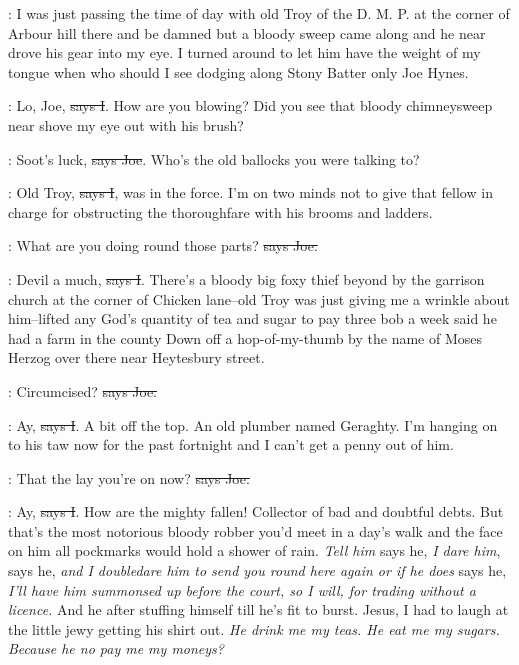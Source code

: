 \Nq:
I was just passing the time of day with old Troy of the D. M. P. at the
corner of Arbour hill there and be damned but a bloody sweep came along
and he near drove his gear into my eye. I turned around to let him have
the weight of my tongue when who should I see dodging along Stony Batter
only Joe Hynes.

:
Lo, Joe, \sout{says I}. How are you blowing? Did you see that bloody
chimneysweep near shove my eye out with his brush?

\joe:
Soot's luck, \sout{says Joe}.
Who's the old ballocks you were talking to?

:
Old Troy, \sout{says I}, was in the force.
I'm on two minds not to give that
fellow in charge for obstructing the thoroughfare
with his brooms and
ladders.

\joe:
What are you doing round those parts? \sout{says Joe.}

:
Devil a much, \sout{says I}.
There's a bloody big foxy thief beyond by the
garrison church at the corner of Chicken lane--old Troy was just giving
me a wrinkle about him--lifted any God's quantity of tea and sugar to pay
three bob a week said he had a farm in the county Down off a
hop-of-my-thumb by the name of Moses Herzog over there near Heytesbury
street.

\joe:
Circumcised? \sout{says Joe.}

:
Ay, \sout{says I}.
A bit off the top. An old plumber named Geraghty. I'm
hanging on to his taw now for the past fortnight and I can't get a penny
out of him.

\joe:
That the lay you're on now? \sout{says Joe.}

:
Ay, \sout{says I}.
How are the mighty fallen! Collector of bad and doubtful
debts. But that's the most notorious bloody robber you'd meet in a day's
walk and the face on him all pockmarks would hold a shower of rain. \emph{Tell
him} says he, \emph{I dare him}, says he, \emph{and I doubledare him to send you round
here again or if he does} says he, \emph{I'll have him summonsed up before the
court, so I will, for trading without a licence.} And he after stuffing
himself till he's fit to burst.
Jesus, I had to laugh at the little jewy
getting his shirt out. \emph{He drink me my teas. He eat me my sugars. Because
he no pay me my moneys?}

